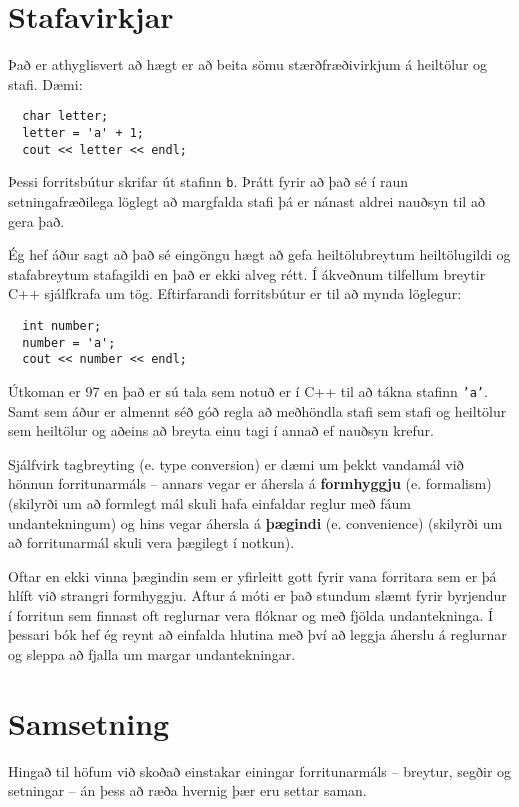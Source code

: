 \section{Stafavirkjar}

Það er athyglisvert að hægt er að beita sömu stærðfræðivirkjum á heiltölur og stafi.
Dæmi: 

\begin{verbatim}
  char letter;
  letter = 'a' + 1;
  cout << letter << endl;
\end{verbatim}
%
Þessi forritsbútur skrifar út stafinn {\tt b}.
Þrátt fyrir að það sé í raun setningafræðilega löglegt að margfalda stafi þá er nánast aldrei nauðsyn til að gera það.

Ég hef áður sagt að það sé eingöngu hægt að gefa heiltölubreytum heiltölugildi og stafabreytum stafagildi en það er ekki alveg rétt.
Í ákveðnum tilfellum breytir C++ sjálfkrafa um tög.
Eftirfarandi forritsbútur er til að mynda löglegur:

\begin{verbatim}
  int number;
  number = 'a';
  cout << number << endl;
\end{verbatim}
%
Útkoman er 97 en það er sú tala sem notuð er í C++ til að tákna stafinn {\tt 'a'}.
Samt sem áður er almennt séð góð regla að meðhöndla stafi sem stafi og heiltölur sem heiltölur og aðeins að breyta einu tagi í annað ef nauðsyn krefur.

Sjálfvirk tagbreyting (e. type conversion) er dæmi um þekkt vandamál við hönnun forritunarmáls --
annars vegar er áhersla á {\bf formhyggju} (e. formalism) (skilyrði um að formlegt mál skuli hafa einfaldar reglur með fáum undantekningum) 
og hins vegar áhersla á {\bf þægindi} (e. convenience) (skilyrði um að forritunarmál skuli vera þægilegt í notkun).

Oftar en ekki vinna þægindin sem er yfirleitt gott fyrir vana forritara sem er þá hlíft við strangri formhyggju.
Aftur á móti er það stundum slæmt fyrir byrjendur í forritun sem finnast oft reglurnar vera flóknar og með fjölda undantekninga.
Í þessari bók hef ég reynt að einfalda hlutina með því að leggja áherslu á reglurnar og sleppa að fjalla um margar undantekningar.

\section{Samsetning}

Hingað til höfum við skoðað einstakar einingar forritunarmáls -- breytur, segðir og setningar -- án þess að ræða hvernig þær eru settar saman.

